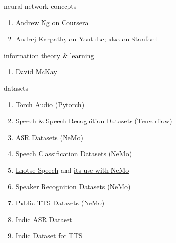 \documentclass[aspectratio=169,xcolor={dvipsnames,svgnames}]{beamer}
\begin{document}
\begin{frame}[label={sec:orge957e03}]{neural network concepts}
\begin{enumerate}
\item \href{https://www.coursera.org/specializations/deep-learning}{Andrew Ng on Coursera}
\item \href{https://www.youtube.com/playlist?list=PLkt2uSq6rBVctENoVBg1TpCC7OQi31AlC}{Andrej Karpathy on Youtube}; also on \href{https://cs231n.stanford.edu/2016/}{Stanford}
\end{enumerate}
\end{frame}

\begin{frame}[label={sec:orgb2cbd14}]{information theory \& learning}
\begin{enumerate}
\item \href{https://www.inference.org.uk/itila/}{David McKay}
\end{enumerate}
\end{frame}

\begin{frame}[label={sec:org991702d}]{datasets}
\begin{enumerate}
\item \href{https://pytorch.org/audio/stable/datasets.html}{Torch Audio (Pytorch)}
\item \href{https://www.tensorflow.org/datasets/catalog/overview\#speech}{Speech \& Speech Recognition Datasets (Tensorflow)}
\item \href{https://docs.nvidia.com/nemo-framework/user-guide/latest/nemotoolkit/asr/datasets.html}{ASR Datasets (NeMo)}
\item \href{https://docs.nvidia.com/nemo-framework/user-guide/latest/nemotoolkit/asr/speech\_classification/datasets.html}{Speech Classification Datasets (NeMo)}
\item \href{https://github.com/lhotse-speech/lhotse}{Lhotse Speech} and \href{https://docs.nvidia.com/nemo-framework/user-guide/latest/nemotoolkit/asr/datasets.html\#lhotse-dataloading}{its use with NeMo}
\item \href{https://docs.nvidia.com/nemo-framework/user-guide/latest/nemotoolkit/asr/speaker\_recognition/datasets.html}{Speaker Recognition Datasets (NeMo)}
\item \href{https://docs.nvidia.com/nemo-framework/user-guide/latest/nemotoolkit/tts/datasets.html\#public-tts-datasets}{Public TTS Datasets (NeMo)}
\item \href{https://github.com/AI4Bharat/vistaar}{Indic ASR Dataset}
\item \href{https://github.com/AI4Bharat/Indic-TTS}{Indic Dataset for TTS}
\end{enumerate}
\end{frame}
\end{document}
